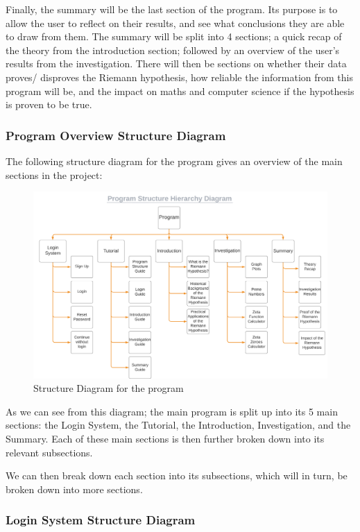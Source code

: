 \documentclass[12pt]{article}
\begin{document}
Finally, the summary will be the last section of the program. Its purpose is to allow the user to reflect on their results, and see what conclusions they are able to draw from them. The summary will be split into 4 sections; a quick recap of the theory from the introduction section; followed by an overview of the user’s results from the investigation. There will then be sections on whether their data proves/ disproves the Riemann hypothesis, how reliable the information from this program will be, and the impact on maths and computer science if the hypothesis is proven to be true.
\clearpage
\subsubsection{Program Overview Structure Diagram}
The following structure diagram for the program gives an overview of the main sections in the project:

\begin{figure}[ht]
    \centering
    \captionsetup{justification=centering}
    \includegraphics[scale=0.095]{program-structure-hierarchy-diagram}
    \caption{Structure Diagram for the program}
\end{figure}

As we can see from this diagram; the main program is split up into its 5 main sections: the Login System, the Tutorial, the Introduction, Investigation, and the Summary. Each of these main sections is then further broken down into its relevant subsections.

We can then break down each section into its subsections, which will in turn, be broken down into more sections.
\clearpage
\subsubsection{Login System Structure Diagram}
\end{document}
